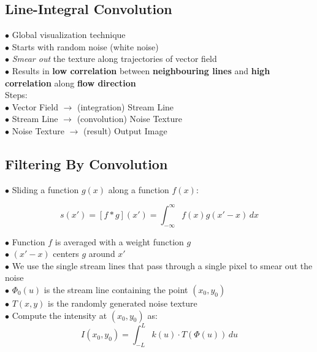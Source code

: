\subsection{Line-Integral Convolution}
$\bullet$ Global visualization technique \\
$\bullet$ Starts with random noise (white noise) \\
$\bullet$ \textit{Smear out} the texture along trajectories of vector field \\
$\bullet$  Results in \textbf{low correlation} between \textbf{neighbouring lines} and \textbf{high correlation} along \textbf{flow direction} \\

Steps: \\
$\bullet$ Vector Field $\rightarrow$ (integration) Stream Line \\
$\bullet$ Stream Line $\rightarrow$ (convolution) Noise Texture \\
$\bullet$ Noise Texture $\rightarrow$ (result) Output Image \\

\subsection{Filtering By Convolution}
$\bullet$ Sliding a function $g(x)$ along a function $f(x)$:

$$s(x') = [f * g](x') = \int_{-\infty}^{\infty} f(x) g(x' - x) \,dx$$

$\bullet$ Function $f$ is averaged with a weight function $g$ \\
$\bullet$ $(x' - x)$ centers $g$ around $x'$ \\

$\bullet$ We use the single stream lines that pass through a single pixel to smear out the noise \\
$\bullet$ $\varPhi_0 (u)$ is the stream line containing the point $(x_0, y_0)$ \\
$\bullet$ $T(x, y)$ is the randomly generated noise texture \\
$\bullet$ Compute the intensity at $(x_0, y_0)$ as: \\
$$I(x_0, y_0) = \int_{-L}^{L} k(u) \cdot T(\varPhi(u)) \,du$$
